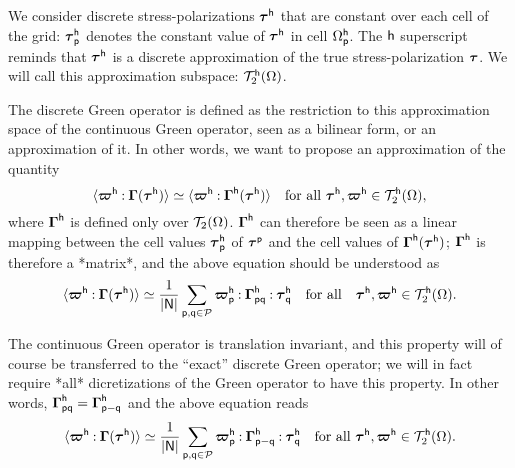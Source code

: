 We consider discrete stress-polarizations \(\boldsymbol\tau^{\mathsf{h}}\) that are
constant over each cell of the grid: \(\boldsymbol\tau_{\mathsf{p}}^{\mathsf{h}}\)
denotes the constant value of \(\boldsymbol\tau^{\mathsf{h}}\) in cell
\(\Omega_{\mathsf{p}}^{\mathsf{h}}\). The \(\mathsf{h}\) superscript reminds that
\(\boldsymbol\tau^{\mathsf{h}}\) is a discrete approximation of the true
stress-polarization \(\boldsymbol\tau\). We will call this approximation subspace:
\(\mathcal T_2^{\mathsf{h}}(\Omega)\).

The discrete Green operator is defined as the restriction to this approximation
space of the continuous Green operator, seen as a bilinear form, or an
approximation of it. In other words, we want to propose an approximation of the
quantity
\begin{equation}
  \langle\boldsymbol\varpi^{\mathsf{h}}\mathbin{\mathord{:}}\boldsymbol\Gamma(\boldsymbol\tau^{\mathsf{h}})\rangle
  \simeq\langle\boldsymbol\varpi^{\mathsf{h}}\mathbin{\mathord{:}}\boldsymbol\Gamma^{\mathsf{h}}(\boldsymbol
  \tau^{\mathsf{h}})\rangle\quad\text{for all }\boldsymbol\tau^{\mathsf{h}},
  \boldsymbol\varpi^{\mathsf{h}}\in\mathcal T_2^{\mathsf{h}}(\Omega),
\end{equation}
where \(\boldsymbol\Gamma^{\mathsf{h}}\) is defined only over
\(\mathcal T_2(\Omega)\). \(\boldsymbol\Gamma^{\mathsf{h}}\) can therefore be seen as a
linear mapping between the cell values \(\boldsymbol\tau_{\mathsf{p}}^{\mathsf{h}}\) of
\(\boldsymbol\tau^{\mathsf{p}}\) and the cell values of
\(\boldsymbol\Gamma^{\mathsf{h}}(\boldsymbol\tau^{\mathsf{h}})\); \(\boldsymbol\Gamma^{\mathsf{h}}\)
is therefore a *matrix*, and the above equation should be understood as
\begin{equation}
  \label{eq:20210928054147}
  \langle\boldsymbol\varpi^{\mathsf{h}}\mathbin{\mathord{:}}\boldsymbol\Gamma(\boldsymbol\tau^{\mathsf{h}})\rangle
  \simeq\frac1{\lvert\mathsf{N}\rvert}\sum_{\mathsf{p}, \mathsf{q}\in\mathcal{P}}
  \boldsymbol\varpi_{\mathsf{p}}^{\mathsf{h}}\mathbin{\mathord{:}}
  \boldsymbol\Gamma_{\mathsf{p}\mathsf{q}}^{\mathsf{h}}\mathbin{\mathord{:}}\boldsymbol
  \tau_{\mathsf{q}}^{\mathsf{h}}
  \quad\text{for all}\quad
  \boldsymbol\tau^{\mathsf{h}},\boldsymbol\varpi^{\mathsf{h}}\in\mathcal T_2^{\mathsf{h}}(\Omega).
\end{equation}

The continuous Green operator is translation invariant, and this property will
of course be transferred to the “exact” discrete Green operator; we will in fact
require *all* dicretizations of the Green operator to have this property. In
other words,
\(\boldsymbol\Gamma_{\mathsf{p}\mathsf{q}}^{\mathsf{h}}=\boldsymbol\Gamma_{\mathsf p-\mathsf
  q}^{\mathsf{h}}\) and the above equation reads
\begin{equation}
  \langle\boldsymbol\varpi^{\mathsf{h}}\mathbin{\mathord{:}}\boldsymbol\Gamma(\boldsymbol\tau^{\mathsf{h}})\rangle
  \simeq\frac1{\lvert\mathsf{N}\rvert}\sum_{\mathsf{p}, \mathsf{q}\in\mathcal{P}}
  \boldsymbol\varpi_{\mathsf{p}}^{\mathsf{h}}\mathbin{\mathord{:}}
  \boldsymbol\Gamma_{\mathsf p-\mathsf q}^{\mathsf{h}}\mathbin{\mathord{:}}\boldsymbol
  \tau_{\mathsf{q}}^{\mathsf{h}}\quad\text{for all }\boldsymbol\tau^{\mathsf{h}},\boldsymbol
  \varpi^{\mathsf{h}}\in\mathcal T_2^{\mathsf{h}}(\Omega).
\end{equation}

